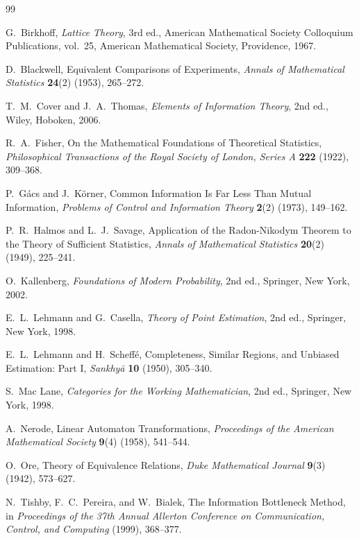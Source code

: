 \documentclass[11pt]{article}
\theoremstyle{definition}
\theoremstyle{remark}
\begin{document}
\begin{thebibliography}{99}

G.~Birkhoff, \emph{Lattice Theory}, 3rd ed., American Mathematical Society Colloquium Publications, vol.~25, American Mathematical Society, Providence, 1967.

D.~Blackwell, Equivalent Comparisons of Experiments, \emph{Annals of Mathematical Statistics} \textbf{24}(2) (1953), 265--272.

T.~M.~Cover and J.~A.~Thomas, \emph{Elements of Information Theory}, 2nd ed., Wiley, Hoboken, 2006.

R.~A.~Fisher, On the Mathematical Foundations of Theoretical Statistics, \emph{Philosophical Transactions of the Royal Society of London, Series A} \textbf{222} (1922), 309--368.

P.~G\'acs and J.~K\"orner, Common Information Is Far Less Than Mutual Information, \emph{Problems of Control and Information Theory} \textbf{2}(2) (1973), 149--162.

P.~R.~Halmos and L.~J.~Savage, Application of the Radon-Nikodym Theorem to the Theory of Sufficient Statistics, \emph{Annals of Mathematical Statistics} \textbf{20}(2) (1949), 225--241.

O.~Kallenberg, \emph{Foundations of Modern Probability}, 2nd ed., Springer, New York, 2002.

E.~L.~Lehmann and G.~Casella, \emph{Theory of Point Estimation}, 2nd ed., Springer, New York, 1998.

E.~L.~Lehmann and H.~Scheff\'e, Completeness, Similar Regions, and Unbiased Estimation: Part I, \emph{Sankhy\={a}} \textbf{10} (1950), 305--340.

S.~Mac Lane, \emph{Categories for the Working Mathematician}, 2nd ed., Springer, New York, 1998.

A.~Nerode, Linear Automaton Transformations, \emph{Proceedings of the American Mathematical Society} \textbf{9}(4) (1958), 541--544.

O.~Ore, Theory of Equivalence Relations, \emph{Duke Mathematical Journal} \textbf{9}(3) (1942), 573--627.

N.~Tishby, F.~C.~Pereira, and W.~Bialek, The Information Bottleneck Method, in \emph{Proceedings of the 37th Annual Allerton Conference on Communication, Control, and Computing} (1999), 368--377.

\end{thebibliography}
\end{document}
